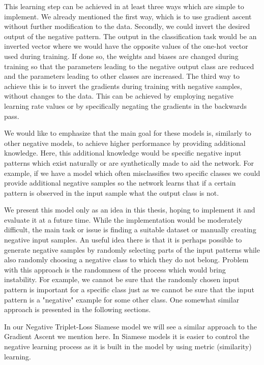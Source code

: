\documentclass[b5paper]{book}
\begin{document}
This learning step can be achieved in at least three ways which are simple to implement. We already mentioned the first way, which is to use gradient ascent without further modification to the data. Secondly, we could invert the desired output of the negative pattern. The output in the classification task would be an inverted vector where we would have the opposite values of the one-hot vector used during training. If done so, the weights and biases are changed during training so that the parameters leading to the negative output class are reduced and the parameters leading to other classes are increased. The third way to achieve this is to invert the gradients during training with negative samples, without changes to the data. This can be achieved by employing negative learning rate values or by specifically negating the gradients in the backwards pass.

We would like to emphasize that the main goal for these models is, similarly to other negative models, to achieve higher performance by providing additional knowledge. Here, this additional knowledge would be specific negative input patterns which exist naturally or are synthetically made to aid the network. For example, if we have a model which often misclassifies two specific classes we could provide additional negative samples so the network learns that if a certain pattern is observed in the input sample what the output class is not. 

We present this model only as an idea in this thesis, hoping to implement it and evaluate it at a future time. While the implementation would be moderately difficult, the main task or issue is finding a suitable dataset or manually creating negative input samples. An useful idea there is that it is perhaps possible to generate negative samples by randomly selecting parts of the input patterns while also randomly choosing a negative class to which they do not belong. Problem with this approach is the randomness of the process which would bring instability. For example, we cannot be sure that the randomly chosen input pattern is important for a specific class just as we cannot be sure that the input pattern is a "negative" example for some other class. One somewhat similar approach is presented in the following sections. 

In our Negative Triplet-Loss Siamese model we will see a similar approach to the Gradient Ascent we mention here. In Siamese models it is easier to control the negative learning process as it is built in the model by using metric (similarity) learning.
\end{document}
